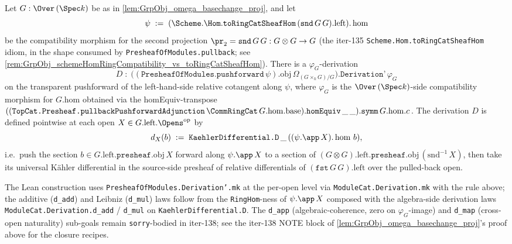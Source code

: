 \begin{lemma}
  \notready
  Let \(G : \Over\,(\Spec k)\) be as in \cref{lem:GrpObj_omega_basechange_proj}, and let
  \[
    \psi \;:=\; (\Scheme.\Hom.\texttt{toRingCatSheafHom}\,(\texttt{snd}\,G\,G).\mathrm{left}).\hom
  \]
  be the compatibility morphism for the second projection
  \(\pr_2 = \texttt{snd}\,G\,G : G \otimes G \to G\) (the iter-135
  \texttt{Scheme.Hom.toRingCatSheafHom} idiom, in the shape consumed by
  \texttt{PresheafOfModules.pullback}; see
  \cref{rem:GrpObj_schemeHomRingCompatibility_vs_toRingCatSheafHom}).
  There is a \(\varphi_G\)-derivation
  \[
    D \;\colon\; \bigl((\texttt{PresheafOfModules.pushforward}\,\psi).\mathrm{obj}\,\Omega_{(G \times_{k} G)/G}\bigr).\texttt{Derivation'}\,\varphi_G
  \]
  on the transparent pushforward of the left-hand-side relative
  cotangent along \(\psi\), where \(\varphi_G\) is the
  \(\Over\,(\Spec k)\)-side compatibility morphism for \(G.\mathrm{hom}\)
  obtained via the homEquiv-transpose
  \(((\texttt{TopCat.Presheaf.pullbackPushforwardAdjunction}\,\CommRingCat\,G.\mathrm{hom}.\mathrm{base}).\texttt{homEquiv}\,\_\,\_).\texttt{symm}\,G.\mathrm{hom}.c\).
  The derivation \(D\) is defined pointwise at each open
  \(X \in G.\mathrm{left}.\Opens^{\mathrm{op}}\) by
  \[
    d_X(b) \;:=\; \texttt{KaehlerDifferential.D}\,\_\,((\psi.\app\,X).\hom\,b),
  \]
  i.e.\ push the section \(b \in G.\mathrm{left}.\texttt{presheaf}.\mathrm{obj}\,X\)
  forward along \(\psi.\app\,X\) to a section of
  \((G \otimes G).\mathrm{left}.\texttt{presheaf}.\mathrm{obj}\,(\mathrm{snd}^{-1}\,X)\),
  then take its universal Kähler differential in the source-side
  presheaf of relative differentials of
  \((\texttt{fst}\,G\,G).\mathrm{left}\) over the pulled-back open.

  The Lean construction uses \texttt{PresheafOfModules.Derivation'.mk}
  at the per-open level via \texttt{ModuleCat.Derivation.mk} with the
  rule above; the additive (\texttt{d\_add}) and Leibniz
  (\texttt{d\_mul}) laws follow from the \texttt{RingHom}-ness of
  \(\psi.\app\,X\) composed with the algebra-side derivation laws
  \texttt{ModuleCat.Derivation.d\_add} / \texttt{d\_mul} on
  \texttt{KaehlerDifferential.D}. The \texttt{d\_app}
  (algebraic-coherence, zero on \(\varphi_G\)-image) and \texttt{d\_map}
  (cross-open naturality) sub-goals remain \texttt{sorry}-bodied in
  iter-138; see the iter-138 NOTE block of
  \cref{lem:GrpObj_omega_basechange_proj}'s proof above for the
  closure recipes.
\end{lemma}

